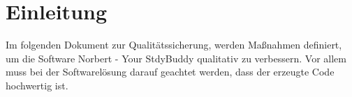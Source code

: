 
\chapter{Einleitung}
Im folgenden Dokument zur Qualitätssicherung, werden Maßnahmen definiert, um die Software Norbert - Your StdyBuddy qualitativ zu verbessern. Vor allem muss bei der Softwarelösung darauf geachtet werden, dass der erzeugte Code hochwertig ist. \\ 






